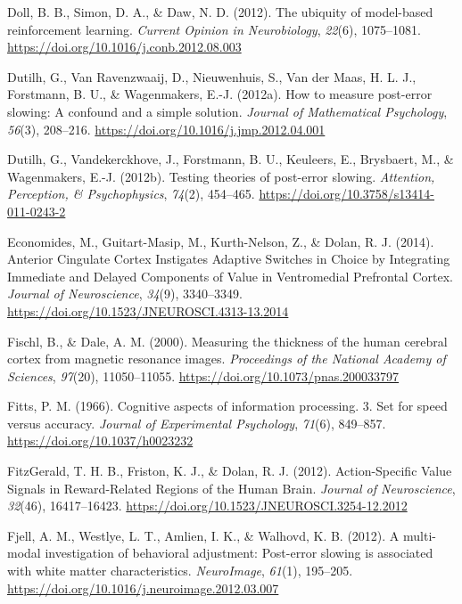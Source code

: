 \documentclass[12pt,openany]{book}
\theoremstyle{definition}
\theoremstyle{definition}
\theoremstyle{definition}
\theoremstyle{remark}
\begin{document}
\hypertarget{ref-Doll2012}{}
Doll, B. B., Simon, D. A., \& Daw, N. D. (2012). The ubiquity of
model-based reinforcement learning. \emph{Current Opinion in
Neurobiology}, \emph{22}(6), 1075--1081.
\url{https://doi.org/10.1016/j.conb.2012.08.003}

\hypertarget{ref-Dutilh2012b}{}
Dutilh, G., Van Ravenzwaaij, D., Nieuwenhuis, S., Van der Maas, H. L.
J., Forstmann, B. U., \& Wagenmakers, E.-J. (2012a). How to measure
post-error slowing: A confound and a simple solution. \emph{Journal of
Mathematical Psychology}, \emph{56}(3), 208--216.
\url{https://doi.org/10.1016/j.jmp.2012.04.001}

\hypertarget{ref-Dutilh2012a}{}
Dutilh, G., Vandekerckhove, J., Forstmann, B. U., Keuleers, E.,
Brysbaert, M., \& Wagenmakers, E.-J. (2012b). Testing theories of
post-error slowing. \emph{Attention, Perception, \& Psychophysics},
\emph{74}(2), 454--465. \url{https://doi.org/10.3758/s13414-011-0243-2}

\hypertarget{ref-Economides2014}{}
Economides, M., Guitart-Masip, M., Kurth-Nelson, Z., \& Dolan, R. J.
(2014). Anterior Cingulate Cortex Instigates Adaptive Switches in Choice
by Integrating Immediate and Delayed Components of Value in Ventromedial
Prefrontal Cortex. \emph{Journal of Neuroscience}, \emph{34}(9),
3340--3349. \url{https://doi.org/10.1523/JNEUROSCI.4313-13.2014}

\hypertarget{ref-Fischl2000}{}
Fischl, B., \& Dale, A. M. (2000). Measuring the thickness of the human
cerebral cortex from magnetic resonance images. \emph{Proceedings of the
National Academy of Sciences}, \emph{97}(20), 11050--11055.
\url{https://doi.org/10.1073/pnas.200033797}

\hypertarget{ref-Fitts1966}{}
Fitts, P. M. (1966). Cognitive aspects of information processing. 3. Set
for speed versus accuracy. \emph{Journal of Experimental Psychology},
\emph{71}(6), 849--857. \url{https://doi.org/10.1037/h0023232}

\hypertarget{ref-FitzGerald2012}{}
FitzGerald, T. H. B., Friston, K. J., \& Dolan, R. J. (2012).
Action-Specific Value Signals in Reward-Related Regions of the Human
Brain. \emph{Journal of Neuroscience}, \emph{32}(46), 16417--16423.
\url{https://doi.org/10.1523/JNEUROSCI.3254-12.2012}

\hypertarget{ref-Fjell2012b}{}
Fjell, A. M., Westlye, L. T., Amlien, I. K., \& Walhovd, K. B. (2012). A
multi-modal investigation of behavioral adjustment: Post-error slowing
is associated with white matter characteristics. \emph{NeuroImage},
\emph{61}(1), 195--205.
\url{https://doi.org/10.1016/j.neuroimage.2012.03.007}
\end{document}
